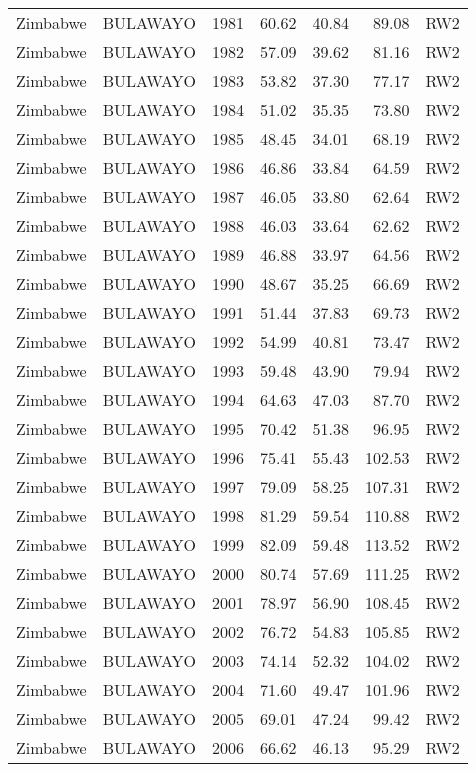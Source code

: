 \begin{longtable}{lllrrrl}
  Zimbabwe & BULAWAYO & 1981 & 60.62 & 40.84 & 89.08 & RW2 \\ 
  Zimbabwe & BULAWAYO & 1982 & 57.09 & 39.62 & 81.16 & RW2 \\ 
  Zimbabwe & BULAWAYO & 1983 & 53.82 & 37.30 & 77.17 & RW2 \\ 
  Zimbabwe & BULAWAYO & 1984 & 51.02 & 35.35 & 73.80 & RW2 \\ 
  Zimbabwe & BULAWAYO & 1985 & 48.45 & 34.01 & 68.19 & RW2 \\ 
  Zimbabwe & BULAWAYO & 1986 & 46.86 & 33.84 & 64.59 & RW2 \\ 
  Zimbabwe & BULAWAYO & 1987 & 46.05 & 33.80 & 62.64 & RW2 \\ 
  Zimbabwe & BULAWAYO & 1988 & 46.03 & 33.64 & 62.62 & RW2 \\ 
  Zimbabwe & BULAWAYO & 1989 & 46.88 & 33.97 & 64.56 & RW2 \\ 
  Zimbabwe & BULAWAYO & 1990 & 48.67 & 35.25 & 66.69 & RW2 \\ 
  Zimbabwe & BULAWAYO & 1991 & 51.44 & 37.83 & 69.73 & RW2 \\ 
  Zimbabwe & BULAWAYO & 1992 & 54.99 & 40.81 & 73.47 & RW2 \\ 
  Zimbabwe & BULAWAYO & 1993 & 59.48 & 43.90 & 79.94 & RW2 \\ 
  Zimbabwe & BULAWAYO & 1994 & 64.63 & 47.03 & 87.70 & RW2 \\ 
  Zimbabwe & BULAWAYO & 1995 & 70.42 & 51.38 & 96.95 & RW2 \\ 
  Zimbabwe & BULAWAYO & 1996 & 75.41 & 55.43 & 102.53 & RW2 \\ 
  Zimbabwe & BULAWAYO & 1997 & 79.09 & 58.25 & 107.31 & RW2 \\ 
  Zimbabwe & BULAWAYO & 1998 & 81.29 & 59.54 & 110.88 & RW2 \\ 
  Zimbabwe & BULAWAYO & 1999 & 82.09 & 59.48 & 113.52 & RW2 \\ 
  Zimbabwe & BULAWAYO & 2000 & 80.74 & 57.69 & 111.25 & RW2 \\ 
  Zimbabwe & BULAWAYO & 2001 & 78.97 & 56.90 & 108.45 & RW2 \\ 
  Zimbabwe & BULAWAYO & 2002 & 76.72 & 54.83 & 105.85 & RW2 \\ 
  Zimbabwe & BULAWAYO & 2003 & 74.14 & 52.32 & 104.02 & RW2 \\ 
  Zimbabwe & BULAWAYO & 2004 & 71.60 & 49.47 & 101.96 & RW2 \\ 
  Zimbabwe & BULAWAYO & 2005 & 69.01 & 47.24 & 99.42 & RW2 \\ 
  Zimbabwe & BULAWAYO & 2006 & 66.62 & 46.13 & 95.29 & RW2 \\ 

\end{longtable}
